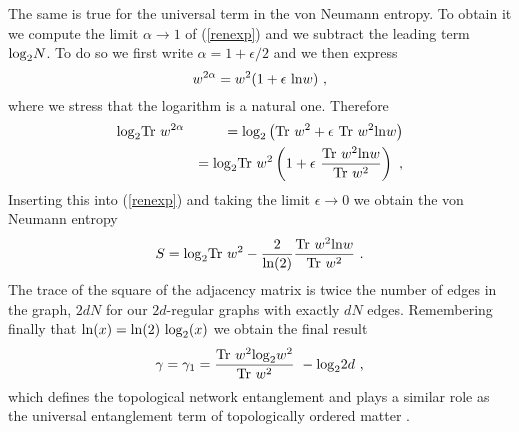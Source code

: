 \documentclass[twocolumn,
preprintnumbers,amsmath,amssymb]{revtex4}
\begin{document}
The same is true for the universal term in the von Neumann entropy. To obtain it we compute the limit $\alpha \to 1$ of (\ref{renexp}) and we subtract the leading term ${\rm log}_2 N$. To do so we first write $\alpha = 1+\epsilon/2$ and we then express
\begin{equation}
w^{2\alpha} = w^2 (1 + \epsilon \ {\rm ln} w) \ ,
\label{first}
\end{equation}
where we stress that the logarithm is a natural one. Therefore
\begin{eqnarray}
{\rm log}_2 {\rm Tr} \  w^{2\alpha} &&=  {\rm log}_2 \left( {\rm Tr}\ w^2 + \epsilon\  {\rm Tr} \ w^2 {\rm ln} w \right) 
\nonumber \\
&&= {\rm log}_2 {\rm Tr} \ w^2 \left( 1 + \epsilon\  {{\rm Tr} \ w^2 {\rm ln} w \over {\rm Tr} \ w^2} \right) \ ,
\label{second}
\end{eqnarray}
Inserting this into (\ref{renexp}) and taking the limit $\epsilon \to 0$ we obtain the von Neumann entropy
\begin{equation}
S= {\rm log}_2 {\rm Tr} \ w^2 - {2\over {\rm ln(2)}} {{\rm Tr} \ w^2 {\rm ln} w \over {\rm Tr} \ w^2} \ .
\label{neumann}
\end{equation}
The trace of the square of the adjacency matrix is twice the number of edges in the graph, $2dN$ for our $2d$-regular graphs with exactly $dN$ edges. 
Remembering finally that ${\rm ln}(x) = {\rm ln} (2) \ {\rm log}_2  (x)$ we obtain the final result
\begin{equation}
\gamma = \gamma_1 =  {{{\rm Tr}\  w^2  {\rm log}_2 w^2}\over {\rm Tr}\  w^2 }\ - {\rm log}_2 2d\ ,
\label{topne}
\end{equation}
which defines the topological network entanglement and plays a similar role as the universal entanglement term \cite{kit} of topologically ordered matter \cite{top}. 
\end{document}
